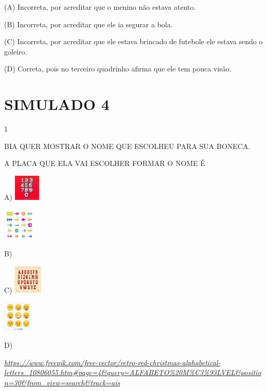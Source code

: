\begin{escola}
(A) Incorreta, por acreditar que o menino não estava atento.

(B) Incorreta, por acreditar que ele ia segurar a bola.

(C) Incorreta, por acreditar que ele estava brincado de futebole ele
estava sendo o goleiro.

(D) Correta, pois no terceiro quadrinho afirma que ele tem pouca visão.

\chapter{SIMULADO 4}

\num{1}

BIA QUER MOSTRAR O NOME QUE ESCOLHEU PARA SUA BONECA.

A PLACA QUE ELA VAI ESCOLHER FORMAR O NOME É

A)
\includegraphics[width=0.48889in,height=0.48889in]{media/image239.jpg}

\includegraphics[width=0.60625in,height=0.60625in]{media/image240.jpg}

B)

C)
\includegraphics[width=0.54236in,height=0.54236in]{media/image241.jpg}

\includegraphics[width=0.57431in,height=0.57431in]{media/image242.jpg}

D)

\href{https://www.freepik.com/free-vector/retro-red-christmas-alphabetical-letters_10806055.htm\#page=4\&query=ALFABETO\%20M\%C3\%93LVEL\&position=30\&from_view=search\&track=ais}{\emph{https://www.freepik.com/free-vector/retro-red-christmas-alphabetical-letters\_10806055.htm\#page=4\&query=ALFABETO\%20M\%C3\%93LVEL\&position=30\&from\_view=search\&track=ais}}


\end{escola}
